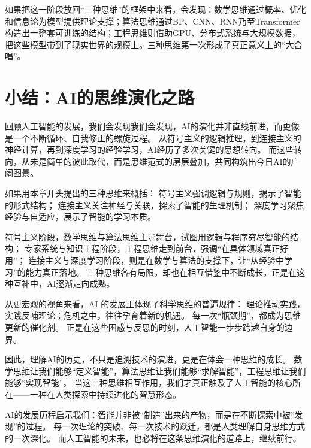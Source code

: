 如果把这一阶段放回“三种思维”的框架中来看，会发现：数学思维通过概率、优化和信息论为模型提供理论支撑；算法思维通过BP、CNN、RNN乃至Transformer构造出一整套可训练的结构；工程思维则借助GPU、分布式系统与大规模数据，把这些模型带到了现实世界的规模上。三种思维第一次形成了真正意义上的“大合唱”。

\section{小结：AI的思维演化之路}

回顾人工智能的发展，我们会发现我们会发现，AI的演化并非直线前进，而更像是一个不断循环、自我修正的螺旋过程。 
从符号主义的逻辑推理，到连接主义的神经计算，再到深度学习的经验学习，AI经历了多次关键的思想转向。  而这些转向，从未是简单的彼此取代，而是思维范式的层层叠加，共同构筑出今日AI的广阔图景。

如果用本章开头提出的三种思维来概括：  
符号主义强调逻辑与规则，揭示了智能的形式结构；  
连接主义关注神经与关联，探索了智能的生理机制；  
深度学习聚焦经验与自适应，展示了智能的学习本质。  

符号主义阶段，数学思维与算法思维主导舞台，试图用逻辑与程序穷尽智能的结构；  
专家系统与知识工程阶段，工程思维走到前台，强调“在具体领域真正好用”；  
连接主义与深度学习阶段，则是在数学与算法的支撑下，让“从经验中学习”的能力真正落地。  
三种思维各有局限，却也在相互借鉴中不断成长，正是在这种互补中，AI逐渐走向成熟。

从更宏观的视角来看，AI 的发展正体现了科学思维的普遍规律：  
理论推动实践，实践反哺理论；危机之中，往往孕育着新的机遇。  
每一次“瓶颈期”，都成为思维更新的催化剂。  
正是在这些困惑与反思的时刻，人工智能一步步跨越自身的边界。

因此，理解AI的历史，不只是追溯技术的演进，更是在体会一种思维的成长。  
数学思维让我们能够“定义智能”，算法思维让我们能够“求解智能”，工程思维让我们能够“实现智能”。  
当这三种思维相互作用，我们才真正触及了人工智能的核心所在——一种在人类探索中持续进化的智慧形态。

AI的发展历程启示我们：智能并非被“制造”出来的产物，而是在不断探索中被“发现”的过程。  
每一次理论的突破、每一次技术的跃迁，都是人类理解自身思维方式的一次深化。  
而人工智能的未来，也必将在这条思维演化的道路上，继续前行。

